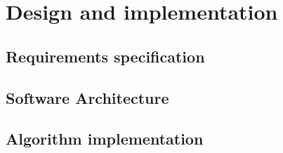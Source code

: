 \chapter{Design and implementation}



\section{Requirements specification}

\section{Software Architecture}

\section{Algorithm implementation}
